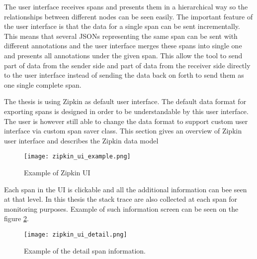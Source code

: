 The user interface receives spans and presents them in a hierarchical way so the relationships between different nodes can be seen easily. The important feature of the user interface is that the data for a single span can be sent incrementally. This means that several JSONs representing the same span can be sent with different annotations and the user interface merges these spans into single one and presents all annotations under the given span. This allow the tool to send part of data from the sender side and part of data from the receiver side directly to the user interface instead of sending the data back on forth to send them as one single complete span.

The thesis is using Zipkin as default user interface. The default data format for exporting spans is designed in order to be understandable by this user interface. The user is however still able to change the data format to support custom user interface via custom span saver class. This section gives an overview of Zipkin user interface and describes the Zipkin data model


\begin{figure}
	\centering
	\texttt{[image: zipkin\_ui\_example.png]}
	\caption{Example of Zipkin UI}
	\label{fig:zipkin_ui}
\end{figure}

Each span in the UI is clickable and all the additional information can bee seen at that level. In this thesis the stack trace are also collected at each span for monitoring purposes. Example of such information screen can be seen on the figure \ref{fig:zipkin_ui_detail}.
\begin{figure}
	\centering
	\texttt{[image: zipkin\_ui\_detail.png]}
	\caption{Example of the detail span information.}
	\label{fig:zipkin_ui_detail}
\end{figure}
